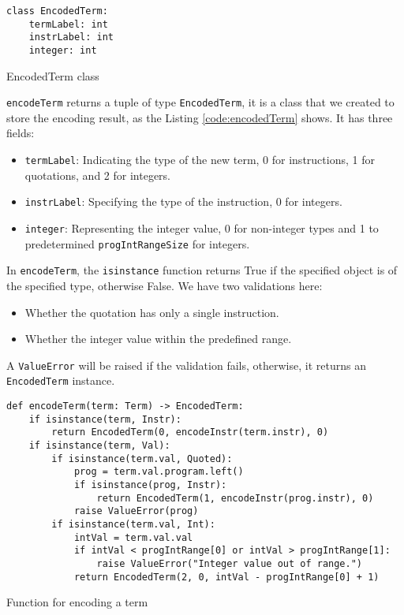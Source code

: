 \begin{listing}[H]
\begin{verbatim}
class EncodedTerm:
    termLabel: int
    instrLabel: int
    integer: int
\end{verbatim}
\caption{EncodedTerm class}
\label{code:encodedTerm}
\end{listing}

\texttt{encodeTerm} returns a tuple of type \texttt{EncodedTerm}, it is a class that we created to store the encoding result, as the Listing \ref{code:encodedTerm} shows. It has three fields:
\begin{itemize}
    \item \texttt{termLabel}: Indicating the type of the new term,  0 for instructions, 1 for quotations, and 2 for integers.
    \item \texttt{instrLabel}: Specifying the type of the instruction, 0 for integers.
    \item \texttt{integer}: Representing the integer value, 0 for non-integer types and 1 to predetermined \texttt{progIntRangeSize} for integers. 
\end{itemize}

In \texttt{encodeTerm}, the \texttt{isinstance} function returns True if the specified object is of the specified type, otherwise False. We have two validations here:
\begin{itemize}
    \item Whether the quotation has only a single instruction.
    \item Whether the integer value within the predefined range.
\end{itemize}

A \texttt{ValueError} will be raised if the validation fails, otherwise, it returns an \texttt{EncodedTerm} instance.
\begin{listing}[H]
\begin{verbatim}
def encodeTerm(term: Term) -> EncodedTerm:
    if isinstance(term, Instr):
        return EncodedTerm(0, encodeInstr(term.instr), 0)
    if isinstance(term, Val):
        if isinstance(term.val, Quoted):
            prog = term.val.program.left()
            if isinstance(prog, Instr):
                return EncodedTerm(1, encodeInstr(prog.instr), 0)
            raise ValueError(prog)
        if isinstance(term.val, Int):
            intVal = term.val.val
            if intVal < progIntRange[0] or intVal > progIntRange[1]:
                raise ValueError("Integer value out of range.")
            return EncodedTerm(2, 0, intVal - progIntRange[0] + 1)
\end{verbatim}
\caption{Function for encoding a term}
\label{lst:encodeTerm}
\end{listing}



